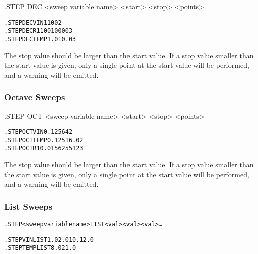 \begin{Command}

\format
.STEP DEC <sweep variable name> <start> <stop> <points>

\examples

\begin{alltt}
.STEP DEC VIN 1 100 2
.STEP DEC R1 100 10000 3 
.STEP DEC TEMP 1.0 10.0 3
\end{alltt}

\comments
The stop value should be larger than the start value.  If a stop value
smaller than the start value is given, only a single point at the
start value will be performed, and a warning will be emitted.

\end{Command}

\subsubsection{Octave Sweeps}
 

\begin{Command}

\format
.STEP OCT <sweep variable name> <start> <stop> <points>

\examples

\begin{alltt}
.STEP OCT VIN 0.125 64 2 
.STEP OCT TEMP 0.125 16.0 2 
.STEP OCT R1 0.015625 512 3
\end{alltt}

\comments
The stop value should be larger than the start value.  If a stop value
smaller than the start value is given, only a single point at the
start value will be performed, and a warning will be emitted.

\end{Command}

\subsubsection{List Sweeps}
 

\begin{Command}

\format
\begin{alltt}
.STEP <sweep variable name> LIST <val> <val> <val>\ldots
\end{alltt}

\examples
\begin{alltt}
.STEP VIN LIST 1.0 2.0 10. 12.0 
.STEP TEMP LIST 8.0 21.0
\end{alltt}

\end{Command}

